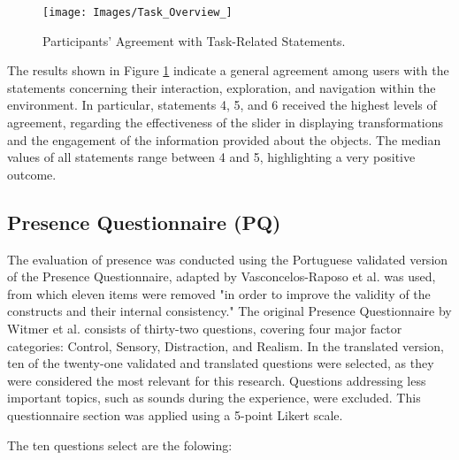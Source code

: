 \begin{figure}[h!]
    \centering
    \texttt{[image: Images/Task\_Overview\_]}
    \caption{Participants’ Agreement with Task-Related Statements.} 
    \label{fig:overview}
\end{figure}
\FloatBarrier


The results shown in Figure \ref{fig:overview} indicate a general agreement among users with the statements concerning their interaction, exploration, and navigation within the environment.
In particular, statements 4, 5, and 6 received the highest levels of agreement, regarding the effectiveness of the slider in displaying transformations and the engagement of the information provided about the objects.
The median values of all statements range between 4 and 5, highlighting a very positive outcome.

\subsection{Presence Questionnaire (PQ)}

The evaluation of presence was conducted using the Portuguese validated version of the Presence Questionnaire, adapted by Vasconcelos-Raposo et al. \cite{Vasconcelos-Raposo03102021} was used, from which eleven items were removed 
"in order to improve the validity of the constructs and their internal consistency."
The original Presence Questionnaire by Witmer et al. \cite{10.1162/105474698565686} consists of thirty-two questions, covering four major factor categories: Control, Sensory, Distraction, and Realism.
In the translated version, ten of the twenty-one validated and translated questions were selected, as they were considered the most relevant for this research. 
Questions addressing less important topics, such as sounds during the experience, were excluded. This questionnaire section was applied using a 5-point Likert scale.

The ten questions select are the folowing:

